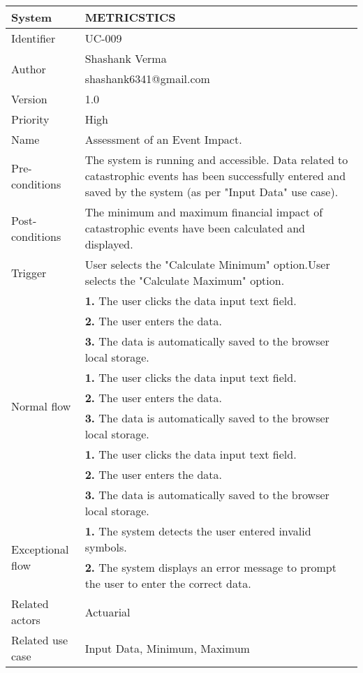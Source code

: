 \begin{table}[htb]
    \centering
     \begin{tabular}{|p{4cm}|p{12cm}|} \hline 
         System &  METRICSTICS\\ \hline 
         
         Identifier & UC-009 \\ \hline 
         
         \multirow{2}{*}{Author} & Shashank Verma   \\
         &shashank6341@gmail.com \\
           \hline 
           Version & 1.0\\ \hline
         
         Priority &  High\\ \hline 
         
         Name & Assessment of an Event Impact. \\ \hline 
         Pre-conditions & The system is running and accessible.
Data related to catastrophic events has been successfully entered and saved by the system (as per "Input Data" use case). \\ \hline 
         Post-conditions & The minimum and maximum financial impact of catastrophic events have been calculated and displayed.  \\ \hline
         Trigger & User selects the "Calculate Minimum" option.User selects the "Calculate Maximum" option. \\ \hline
        \multirow{9}{*}{Normal flow} 
        & \textbf{1.} The user clicks the data input text field. \\ 
        & \textbf{2.} The user enters the data.   \\ 
 & \textbf{3.}  The data is automatically saved to the browser local storage. \\ 
 & \textbf{1.} The user clicks the data input text field. \\ 
        & \textbf{2.} The user enters the data.   \\ 
 & \textbf{3.}  The data is automatically saved to the browser local storage. \\ 
 & \textbf{1.} The user clicks the data input text field. \\ 
        & \textbf{2.} The user enters the data.   \\ 
 & \textbf{3.}  The data is automatically saved to the browser local storage. \\ 
         
        
        \hline
        \multirow{2}{*}{Exceptional flow} 
        & \textbf{1.} The system detects the user entered invalid symbols. \\ 
        & \textbf{2.} The system displays an error message to prompt the user to enter the correct data.   \\  \hline 
        Related actors & Actuarial \\ \hline
        Related use case & Input Data, Minimum, Maximum  \\ \hline
    \end{tabular}
    \caption{}
    \label{tab:my_label}
\end{table}
